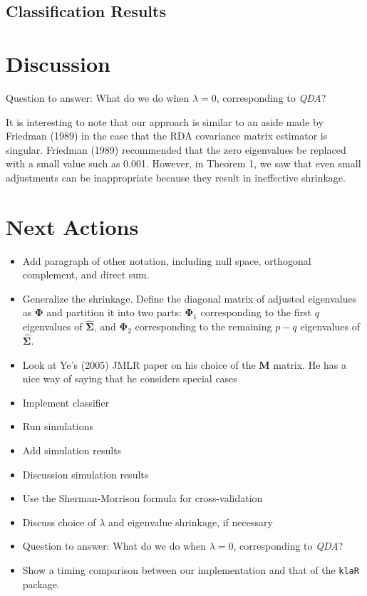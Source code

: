 \documentclass[11pt]{article}
\begin{document}
\subsection{Classification Results}


\section{Discussion}

Question to answer: What do we do when $\lambda = 0$, corresponding to \emph{QDA}?

It is interesting to note that our approach is similar to an aside made by Friedman (1989) in the case that the RDA covariance matrix estimator is singular. Friedman (1989) recommended that the zero eigenvalues be replaced with a small value such as 0.001. However, in Theorem 1, we saw that even small adjustments can be inappropriate because they result in ineffective shrinkage.

\section{Next Actions}

\begin{itemize}
\item Add paragraph of other notation, including null space, orthogonal complement, and direct sum.
\item Generalize the shrinkage. Define the diagonal matrix of adjusted eigenvalues as $\bm \Phi$ and partition it into two parts: $\bm \Phi_1$ corresponding to the first $q$ eigenvalues of $\widehat{\bm \Sigma}$, and $\bm \Phi_2$ corresponding to the remaining $p - q$ eigenvalues of $\widehat{\bm \Sigma}$.
\item Look at Ye's (2005) JMLR paper on his choice of the $\bm M$ matrix. He has a nice way of saying that he considers special cases
\item Implement classifier
\item Run simulations
\item Add simulation results
\item Discussion simulation results
\item Use the Sherman-Morrison formula for cross-validation
\item Discuss choice of $\lambda$ and eigenvalue shrinkage, if necessary
\item Question to answer: What do we do when $\lambda = 0$, corresponding to \emph{QDA}?
\item Show a timing comparison between our implementation and that of the {\tt klaR} package.
\end{itemize}

	



\end{document}
